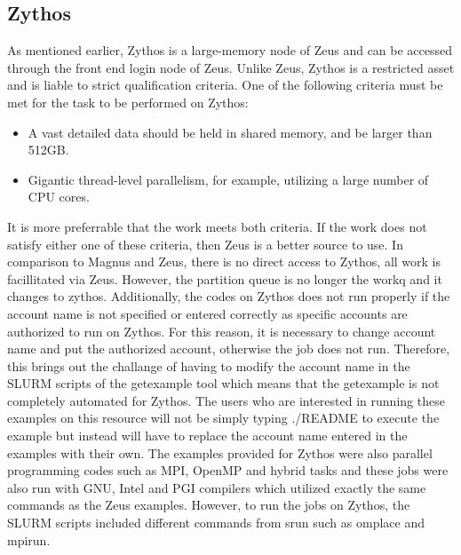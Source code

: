 \subsection{Zythos}
As mentioned earlier, Zythos is a large-memory node of Zeus and can be accessed through the front end login node of Zeus. Unlike Zeus, Zythos is a 
restricted asset and is liable to strict qualification criteria. One of the following criteria must be met for the task to be performed on Zythos:

\begin{itemize}
\item A vast detailed data should be held in shared memory, and be larger than 512GB.
\item Gigantic thread-level parallelism, for example, utilizing a large number of CPU cores.
\end{itemize}

It is more preferrable that the work meets both criteria. If the work does not satisfy either one of these criteria, then Zeus is a better source to
use. In comparison to  Magnus and Zeus, there is no direct access to Zythos, all work is facillitated via Zeus. However, the partition queue is no longer
the workq and it changes to zythos. Additionally, the codes on Zythos does not run properly if the account name is not specified or 
entered correctly as specific accounts are authorized to run on Zythos. For this reason, it is necessary to change account name and put the authorized 
account, otherwise the job does not run. Therefore, this brings out the challange of having to modify the account name in the SLURM scripts of the 
getexample tool which means that the getexample is not completely automated for Zythos. The users who are interested in running these examples on this 
resource will not be simply typing ./README to execute the example but instead will have to replace the account name entered in the examples with their 
own. The examples provided for Zythos were also parallel programming codes such as MPI, OpenMP and hybrid tasks and these jobs were also run with GNU, 
Intel and PGI compilers which utilized exactly the same commands as the Zeus examples. However, to run the jobs on Zythos, the SLURM scripts included
different commands from srun such as omplace and mpirun. 

